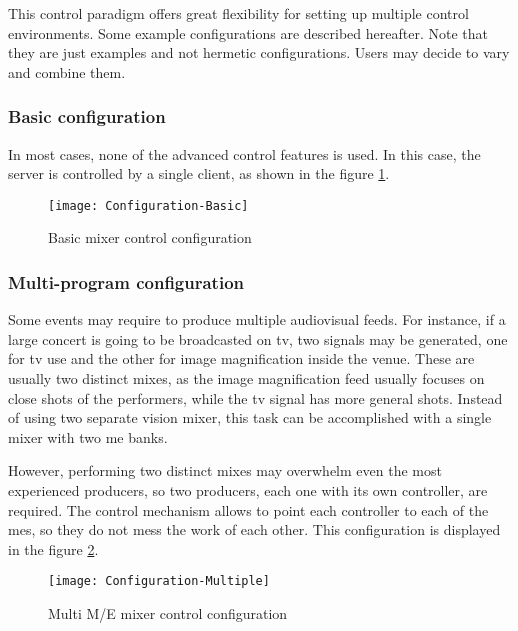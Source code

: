 \documentclass[../main.tex]{subfiles}
\begin{document}
This control paradigm offers great flexibility for setting up multiple control environments. Some example configurations are described hereafter. Note that they are just examples and not hermetic configurations. Users may decide to vary and combine them.\newline

\subsubsection{Basic configuration}
In most cases, none of the advanced control features is used.  In this case, the server is controlled by a single client, as shown in the figure \ref{fig:04:configuration_basic}.\newline

\begin{figure}[htbp]
    \centering
    \texttt{[image: Configuration-Basic]}

    \caption{Basic mixer control configuration}
    \label{fig:04:configuration_basic}
\end{figure}

\subsubsection{Multi-program configuration}
Some events may require to produce multiple audiovisual feeds. For instance, if a large concert is going to be broadcasted on \gls{tv}, two signals may be generated, one for \gls{tv} use and the other for image magnification inside the venue. These are usually two distinct mixes, as the image magnification feed usually focuses on close shots of the performers, while the \gls{tv} signal has more general shots. Instead of using two separate vision mixer, this task can be accomplished with a single mixer with two \gls{me} banks.\newline

However, performing two distinct mixes may overwhelm even the most experienced producers, so two producers, each one with its own controller, are required. The control mechanism allows to point each controller to each of the \glspl{me}, so they do not mess the work of each other. This configuration is displayed in the figure \ref{fig:04:configuration_multiple}.\newline

\begin{figure}[htbp]
    \centering
    \texttt{[image: Configuration-Multiple]}

    \caption{Multi M/E mixer control configuration}
    \label{fig:04:configuration_multiple}
\end{figure}
\end{document}

